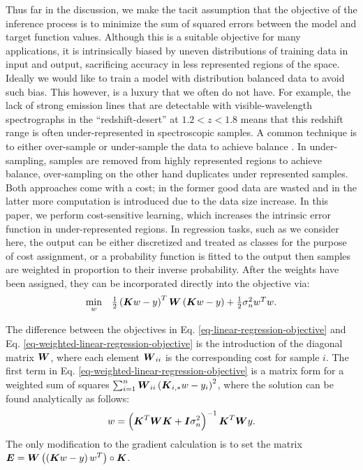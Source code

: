 \documentclass[useAMS,usenatbib,fleqn]{mn2e}
\begin{document}
Thus far in the discussion, we make the tacit assumption that the objective of the inference process is to minimize the sum of squared errors between the model and target function values. Although this is a suitable objective for many applications, it is intrinsically biased by uneven distributions of training data in input and output, sacrificing accuracy in less represented regions of the space. Ideally we would like to train a model with distribution balanced data to avoid such bias. This however, is a luxury that we often do not have. For example, the lack of strong emission lines that are detectable with visible-wavelength spectrographs in the ``redshift-desert'' at $1.2 < z <1.8$ means that this redshift range is often under-represented in spectroscopic samples. A common technique is to either over-sample or under-sample the data to achieve balance \citep{weiss2007}. In under-sampling, samples are removed from highly represented regions to achieve balance, over-sampling on the other hand duplicates under represented samples. Both approaches come with a cost; in the former good data are wasted and in the latter more computation is introduced due to the data size increase. In this paper, we perform cost-sensitive learning, which increases the intrinsic error function in under-represented regions. In regression tasks, such as we consider here, the output can be either discretized and treated as classes for the purpose of cost assignment, or a probability function is fitted to the output then samples are weighted in proportion to their inverse probability. After the weights have been assigned, they can be incorporated directly into the objective via:
\begin{equation}
\label{eq-weighted-linear-regression-objective}
\begin{array}{lcl}
\underset{w}{\text{min}} &\frac{1}{2}\left ( \bmath{K}w-y \right )^{T} \bmath{W}\left( \bmath{K}w-y \right )+\frac{1}{2}\sigma_{n}^{2}w^{T}w.
\end{array}
\end{equation}

The difference between the objectives in Eq. \eqref{eq-linear-regression-objective} and Eq. \eqref{eq-weighted-linear-regression-objective} is the introduction of the diagonal matrix $\bmath{W}$, where each element $\bmath{W}_{ii}$ is the corresponding cost for sample $i$. The first term in Eq. \eqref{eq-weighted-linear-regression-objective} is a matrix form for a weighted sum of squares $\sum_{i=1}^{n}\bmath{W}_{ii}\left(\bmath{K}_{i,*}w-y_{i}\right)^{2}$, where the solution can be found analytically as follows:
\begin{equation}
\label{eq-weighted-linear-regression-objective-rectangular}
w = \left(\bmath{K}^{T}\bmath{WK}+\bmath{I}\sigma_{n}^{2} \right)^{-1}\bmath{K}^{T}\bmath{W}y.
\end{equation}
The only modification to the gradient calculation is to set the matrix $\bmath{E}=\bmath{W}\left(\left(\bmath{K}w-y\right)w^{T}\right)\circ\bmath{K}$.
\end{document}
